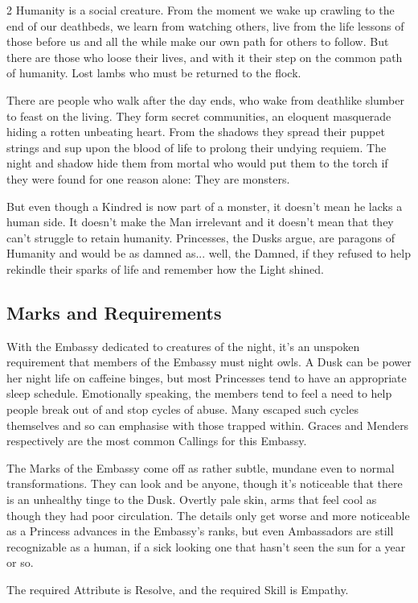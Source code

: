 \begin{multicols}{2}
Humanity is a social creature. From the moment we wake up crawling to the end of our deathbeds, we learn from watching others, live from the life lessons of those before us and all the while make our own path for others to follow. But there are those who loose their lives, and with it their step on the common path of humanity. Lost lambs who must be returned to the flock.

There are people who walk after the day ends, who wake from deathlike slumber to feast on the living. They form secret communities, an eloquent masquerade hiding a rotten unbeating heart. From the shadows they spread their puppet strings and sup upon the blood of life to prolong their undying requiem. The night and shadow hide them from mortal who would put them to the torch if they were found for one reason alone: They are monsters.

But even though a Kindred is now part of a monster, it doesn’t mean he lacks a human side. It doesn’t make the Man irrelevant and it doesn’t mean that they can't struggle to retain humanity. Princesses, the Dusks argue, are paragons of Humanity and would be as damned as... well, the Damned, if they refused to help rekindle their sparks of life and remember how the Light shined.

\subsection*{Marks and Requirements} With the Embassy dedicated to creatures of the night, it's an unspoken requirement that members of the Embassy must night owls. A Dusk can be power her night life on caffeine binges, but most Princesses tend to have an appropriate sleep schedule.  Emotionally speaking, the members tend to feel a need to help people break out of and stop cycles of abuse. Many escaped such cycles themselves and so can emphasise with those trapped within. Graces and Menders respectively are the most common Callings for this Embassy.

The Marks of the Embassy come off as rather subtle, mundane even to normal transformations. They can look and be anyone, though it’s noticeable that there is an unhealthy tinge to the Dusk. Overtly pale skin, arms that feel cool as though they had poor circulation. The details only get worse and more noticeable as a Princess advances in the Embassy's ranks, but even Ambassadors are still recognizable as a human, if a sick looking one that hasn’t seen the sun for a year or so.

The required Attribute is Resolve, and the required Skill is Empathy. 



\end{multicols}
